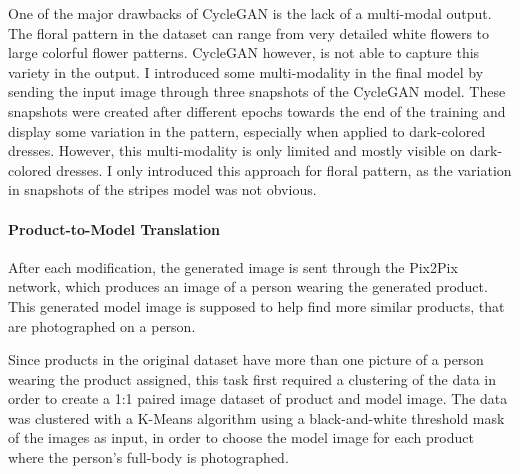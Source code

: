 \documentclass[12pt]{report}
\begin{document}
One of the major drawbacks of CycleGAN is the lack of a multi-modal output. The floral pattern in the dataset can range from very detailed white flowers to large colorful flower patterns. CycleGAN however, is not able to capture this variety in the output. I introduced some multi-modality in the final model by sending the input image through three snapshots of the CycleGAN model. These snapshots were created after different epochs towards the end of the training and display some variation in the pattern, especially when applied to dark-colored dresses. However, this multi-modality is only limited and mostly visible on dark-colored dresses. I only introduced this approach for floral pattern, as the variation in snapshots of the stripes model was not obvious.

%



\paragraph{Product-to-Model Translation}
After each modification, the generated image is sent through the Pix2Pix network, which produces an image of a person wearing the generated product. This generated model image is supposed to help find more similar products, that are photographed on a person.

Since products in the original dataset have more than one picture of a person wearing the product assigned, this task first required a clustering of the data in order to create a 1:1 paired image dataset of product and model image. The data was clustered with a K-Means algorithm using a black-and-white threshold mask of the images as input, in order to choose the model image for each product where the person's full-body is photographed.
\end{document}
